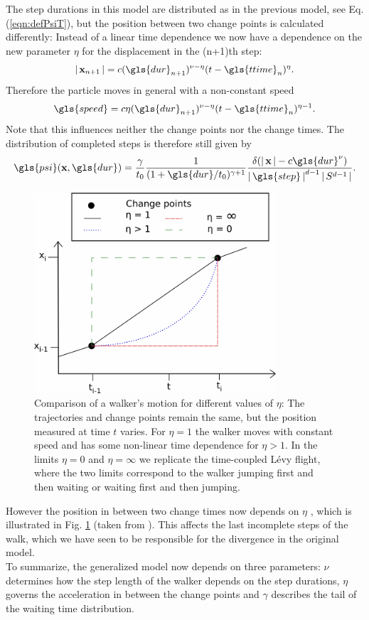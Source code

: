 The step durations in this model are distributed as in the previous model, see Eq. (\ref{eqn:defPsiT}), but the position between two change points is calculated differently: Instead of a linear time dependence we now have a dependence on the new parameter $\eta$ for the displacement in the (n+1)th step:
%
\begin{align}
\abs{\ve{x}_{n+1}} = c (\gls{dur}_{n+1})^{\nu-\eta} (t-\gls{ttime}_n)^{\eta} .
\end{align}
%
Therefore the particle moves in general with a non-constant speed  
%
\begin{align}
\gls{speed} = c \eta (\gls{dur}_{n+1})^{\nu-\eta} (t-\gls{ttime}_n)^{\eta-1} .
\end{align}
%
Note that this influences neither the change points nor the change times. The distribution of completed steps is therefore still given by 
%
\begin{align}
\gls{psi}(\ve{x}, \gls{dur} ) = \frac{\gamma}{t_0} \frac{1}{(1+\gls{dur}/t_0)^{\gamma+1}}  \frac{\delta(\abs{\ve{x}} - c \gls{dur}^{\nu}) }{\abs{\gls{step}}^{d-1} \abs{S^{d-1}}}  .
\end{align}
%
\begin{figure}[!htb]
\begin{center}
\includegraphics[width=90mm]{pics/turningPoints.png}
\caption{Comparison of a walker's motion for different values of $\eta$: The trajectories and change points remain the same, but the position measured at time $t$ varies. For $\eta = 1$ the walker moves with constant speed and has some non-linear time dependence for $\eta > 1$. In the limits $\eta = 0$ and $\eta = \infty$ we replicate the time-coupled L\'evy flight, where the two limits correspond to the walker jumping first and then waiting or waiting first and then jumping. 
\label{fig:turningPoints}}
\end{center}
\end{figure}
%
However the position in between two change times now depends on $\eta$ 
\cite{radons2018}, 
which is  illustrated in Fig. \ref{fig:turningPoints} (taken from 
\cite{bothe}). 
This affects the last incomplete steps of the walk, which we have seen to be responsible for the divergence in the original model. \\
To summarize, the generalized model now depends on three parameters: $\nu$ determines how the step length of the walker depends on the step durations, $\eta$ governs the acceleration in between the change points and $\gamma$ describes the tail of the waiting time distribution. 


